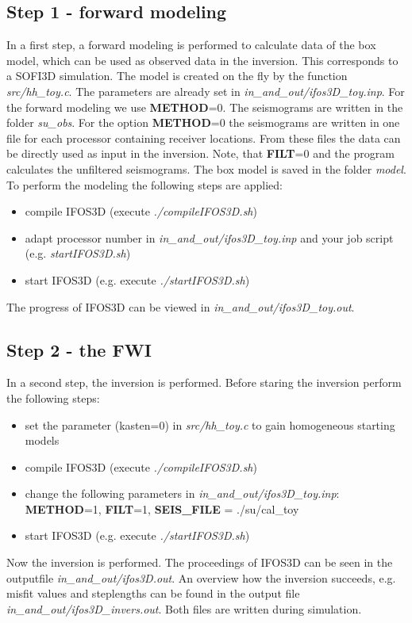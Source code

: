 \subsection{Step 1 - forward modeling}
In a first step, a forward modeling is performed to calculate data of the box model, which can be used as observed data in the inversion. This corresponds to a SOFI3D simulation. The model is created on the fly by the function \textit{src/hh\_toy.c}. The parameters are already set in \textit{in\_and\_out/ifos3D\_toy.inp}. For the forward modeling we use \textbf{METHOD}=0. The seismograms are written in the folder \textit{su\_obs}. For the option \textbf{METHOD}=0 the seismograms are written in one file for each processor containing receiver locations. From these files the data can be directly used as input in the inversion. Note, that \textbf{FILT}=0 and the program calculates the unfiltered seismograms. The box model is saved in the folder \textit{model}.\\
To perform the modeling the following steps are applied:
\begin{itemize}
 \item compile IFOS3D (execute \textit{./compileIFOS3D.sh})
 \item adapt processor number in \textit{in\_and\_out/ifos3D\_toy.inp} and your job script (e.g. \textit{startIFOS3D.sh})
 \item start IFOS3D (e.g. execute \textit{./startIFOS3D.sh})
\end{itemize}
The progress of IFOS3D can be viewed in \textit{in\_and\_out/ifos3D\_toy.out}. 
\subsection{Step 2 - the FWI}
In a second step, the inversion is performed. Before staring the inversion perform the following steps:
\begin{itemize}
 \item set the parameter (kasten=0) in \textit{src/hh\_toy.c} to gain homogeneous starting models
 \item compile IFOS3D (execute \textit{./compileIFOS3D.sh})
 \item change the following parameters in \textit{in\_and\_out/ifos3D\_toy.inp}: \textbf{METHOD}=1, \textbf{FILT}=1, \textbf{SEIS\_FILE} = ./su/cal\_toy
 \item start IFOS3D (e.g. execute \textit{./startIFOS3D.sh})
\end{itemize}
Now the inversion is performed. The proceedings of IFOS3D can be seen in the outputfile \textit{in\_and\_out/ifos3D.out}. An overview how the inversion succeeds, e.g. misfit values and steplengths can be found in the output file \textit{in\_and\_out/ifos3D\_invers.out}. Both files are written during simulation.
